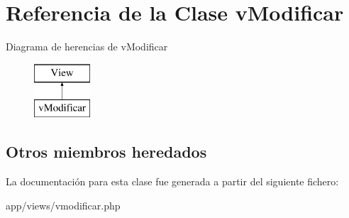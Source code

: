 \hypertarget{classv_modificar}{}\section{Referencia de la Clase v\+Modificar}
\label{classv_modificar}
Diagrama de herencias de v\+Modificar\begin{figure}[H]
\begin{center}
\leavevmode
\includegraphics[height=2.000000cm]{classv_modificar}
\end{center}
\end{figure}
\subsection*{Otros miembros heredados}


La documentación para esta clase fue generada a partir del siguiente fichero\+:\begin{DoxyCompactItemize}
\item 
app/views/vmodificar.\+php\end{DoxyCompactItemize}
